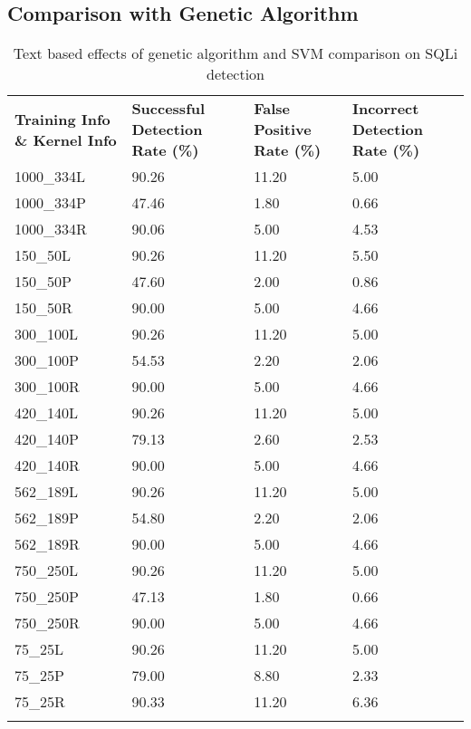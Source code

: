 \begin{appendices}
\section{Comparison with Genetic Algorithm}
\begin{longtable}{|p{1.5in}|p{1in}|p{1in}|p{1in}|}
	\hline
	\textbf{Training Info \& Kernel Info} & \textbf{Successful Detection Rate (\%)} & \textbf{False Positive Rate (\%)} & \textbf{Incorrect Detection Rate (\%)}  \\
	\hhline{|=|=|=|=|}
	1000\_334L 	& 90.26 & 11.20 & 5.00 \\ \hline
	1000\_334P 	& 47.46 &  1.80 & 0.66 \\ \hline
	1000\_334R 	& 90.06 &  5.00 & 4.53 \\ \hline
	150\_50L 	& 90.26 & 11.20 & 5.50 \\ \hline
	150\_50P 	& 47.60 &  2.00 & 0.86 \\ \hline
	150\_50R 	& 90.00 &  5.00 & 4.66 \\ \hline
	300\_100L 	& 90.26 & 11.20 & 5.00 \\ \hline
	300\_100P 	& 54.53 &  2.20 & 2.06 \\ \hline
	300\_100R 	& 90.00 &  5.00 & 4.66 \\ \hline
	420\_140L 	& 90.26 & 11.20 & 5.00 \\ \hline
	420\_140P 	& 79.13 &  2.60 & 2.53 \\ \hline
	420\_140R 	& 90.00 &  5.00 & 4.66 \\ \hline
	562\_189L 	& 90.26 & 11.20 & 5.00 \\ \hline
	562\_189P 	& 54.80 &  2.20 & 2.06 \\ \hline
	562\_189R 	& 90.00 &  5.00 & 4.66 \\ \hline
	750\_250L 	& 90.26 & 11.20 & 5.00 \\ \hline
	750\_250P 	& 47.13 &  1.80 & 0.66 \\ \hline
	750\_250R 	& 90.00 &  5.00 & 4.66 \\ \hline
	75\_25L 		& 90.26 & 11.20 & 5.00 \\ \hline
	75\_25P 		& 79.00 &  8.80 & 2.33 \\ \hline
	75\_25R 		& 90.33 & 11.20 & 6.36 \\ \hline
	\caption[]{Text based effects of genetic algorithm and SVM comparison on SQLi detection}
	\label{app:sqlComparisonText}
\end{longtable}


\end{appendices}
